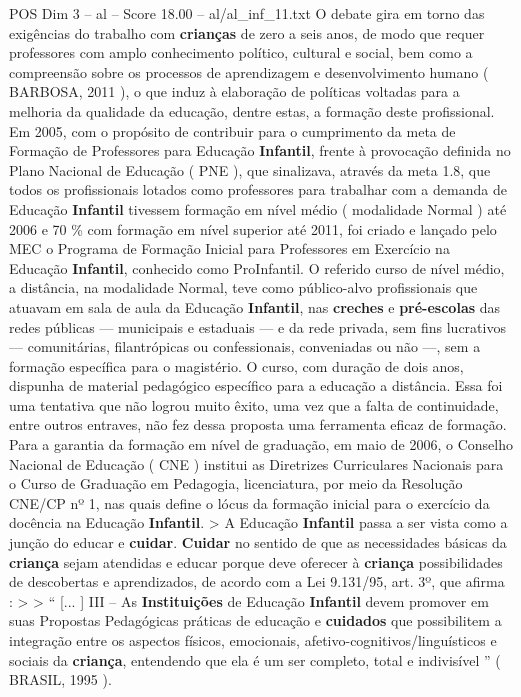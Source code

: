 \begin{textsample}{POS Dim 3 – al – Score 18.00 – al/al\_inf\_11.txt}
O debate gira em torno das exigências do trabalho com \textbf{crianças} de zero a seis anos, de modo que requer professores com amplo conhecimento político, cultural e social, bem como a compreensão sobre os processos de aprendizagem e desenvolvimento humano ( BARBOSA, 2011 ), o que induz à elaboração de políticas voltadas para a melhoria da qualidade da educação, dentre estas, a formação deste profissional.
Em 2005, com o propósito de contribuir para o cumprimento da meta de Formação de Professores para Educação \textbf{Infantil}, frente à provocação definida no Plano Nacional de Educação ( PNE ), que sinalizava, através da meta 1.8, que todos os profissionais lotados como professores para trabalhar com a demanda de Educação \textbf{Infantil} tivessem formação em nível médio ( modalidade Normal ) até 2006 e 70 \% com formação em nível superior até 2011, foi criado e lançado pelo MEC o Programa de Formação Inicial para Professores em Exercício na Educação \textbf{Infantil}, conhecido como ProInfantil.
O referido curso de nível médio, a distância, na modalidade Normal, teve como público-alvo profissionais que atuavam em sala de aula da Educação \textbf{Infantil}, nas \textbf{creches} e \textbf{pré-escolas} das redes públicas — municipais e estaduais — e da rede privada, sem fins lucrativos — comunitárias, filantrópicas ou confessionais, conveniadas ou não —, sem a formação específica para o magistério.
O curso, com duração de dois anos, dispunha de material pedagógico específico para a educação a distância.
Essa foi uma tentativa que não logrou muito êxito, uma vez que a falta de continuidade, entre outros entraves, não fez dessa proposta uma ferramenta eficaz de formação.
Para a garantia da formação em nível de graduação, em maio de 2006, o Conselho Nacional de Educação ( CNE ) institui as Diretrizes Curriculares Nacionais para o Curso de Graduação em Pedagogia, licenciatura, por meio da Resolução CNE/CP nº 1, nas quais define o lócus da formação inicial para o exercício da docência na Educação \textbf{Infantil}. > A Educação \textbf{Infantil} passa a ser vista como a junção do educar e \textbf{cuidar}. \textbf{Cuidar} no sentido de que as necessidades básicas da \textbf{criança} sejam atendidas e educar porque deve oferecer à \textbf{criança} possibilidades de descobertas e aprendizados, de acordo com a Lei 9.131/95, art. 3º, que afirma : > > “ [... ] III – As \textbf{Instituições} de Educação \textbf{Infantil} devem promover em suas Propostas Pedagógicas práticas de educação e \textbf{cuidados} que possibilitem a integração entre os aspectos físicos, emocionais, afetivo-cognitivos/linguísticos e sociais da \textbf{criança}, entendendo que ela é um ser completo, total e indivisível ” ( BRASIL, 1995 ).

\end{textsample}
